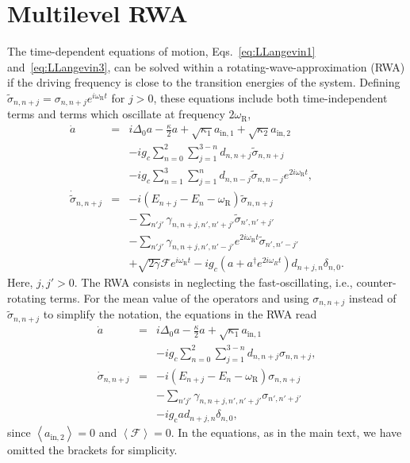 \documentclass[twocolumn,english,aps,prl,preprint,reprint,showpacs,longbibliography,showkeys]{revtex4-1}
\begin{document}
\section{Multilevel RWA\label{sec:RWA}}

The time-dependent equations of motion, Eqs.~\eqref{eq:LLangevin1} and~\eqref{eq:LLangevin3}, can be solved within a rotating-wave-approximation (RWA) if the driving frequency is close to the transition energies of the system. Defining $\tilde{\sigma}_{n,n+j}=\sigma_{n,n+j}e^{i\omega_{\mathrm{R}} t}$ for $j>0$, these equations include both time-independent terms and  terms which oscillate at frequency $2\omega_{\mathrm{R}}$,
\begin{eqnarray}
\dot{a} & =&i \Delta_0 a-\frac{\kappa}{2} a+\sqrt{\kappa_1}a_{\mathrm{in},1}+\sqrt{\kappa_2}a_{\mathrm{in},2}\label{eq:LLangevin1-2}\\
&& -i g_c  \sum_{n=0}^{2}\sum_{j=1}^{3-n}d_{n,n+j}\tilde{\sigma}_{n,n+j}\nonumber\\
&& -i g_c  \sum_{n=1}^{3}\sum_{j=1}^{n}d_{n,n-j}\tilde{\sigma}_{n,n-j}e^{2i\omega_{\mathrm{R}} t} ,\nonumber\\
\dot{\tilde{\sigma}}_{n,n+j} & =&-i \left(E_{n+j}-E_n-\omega_{\mathrm{R}}\right) \tilde{\sigma}_{n,n+j}\label{eq:LLangevin3-2}\\
&&-\sum_{n'j'}\gamma_{n,n+j,n',n'+j'} \tilde{\sigma}_{n',n'+j'} \nonumber\\
&&-\sum_{n'j'}\gamma_{n,n+j,n',n'-j'} e^{2i\omega_{\mathrm{R}} t}\tilde{\sigma}_{n',n'-j'} \nonumber \\
&&+\sqrt{2\gamma}\mathcal{F}e^{i\omega_{\mathrm{R}} t}  -i g_c \left(a +a^{\dagger} e^{2i\omega_{R}t} \right)d_{n+j,n}\delta_{n,0}. \nonumber
\end{eqnarray} 
Here, $j,j'>0$. The RWA consists in neglecting the fast-oscillating, i.e., counter-rotating terms. For the mean value of the operators and using $\sigma_{n,n+j}$ instead of $\tilde{\sigma}_{n,n+j}$  to simplify the notation, the equations in the RWA read
 \begin{eqnarray}
\dot{a} & =&i \Delta_0 a-\frac{\kappa}{2} a+\sqrt{\kappa_1}a_{\mathrm{in},1}\label{eq:LLangevin1-3}\\
&& -i g_c  \sum_{n=0}^{2}\sum_{j=1}^{3-n}d_{n,n+j}\sigma_{n,n+j} , \nonumber\\
\dot{\sigma}_{n,n+j} & =&-i \left(E_{n+j}-E_n-\omega_{\mathrm{R}}\right) \sigma_{n,n+j}\nonumber\\
&&-\sum_{n'j'}\gamma_{n,n+j,n',n'+j'} \sigma_{n',n'+j'}  \label{eq:LLangevin3-3}\\
&&  -i g_{\mathrm{c}} a d_{n+j,n}\delta_{n,0}, \nonumber
\end{eqnarray} 
since $\left\langle a_{\mathrm{in},2}\right\rangle=0$ and $\left\langle\mathcal{F}\right\rangle=0$. In the equations, as in the main text, we have omitted the brackets  for simplicity.
\end{document}
